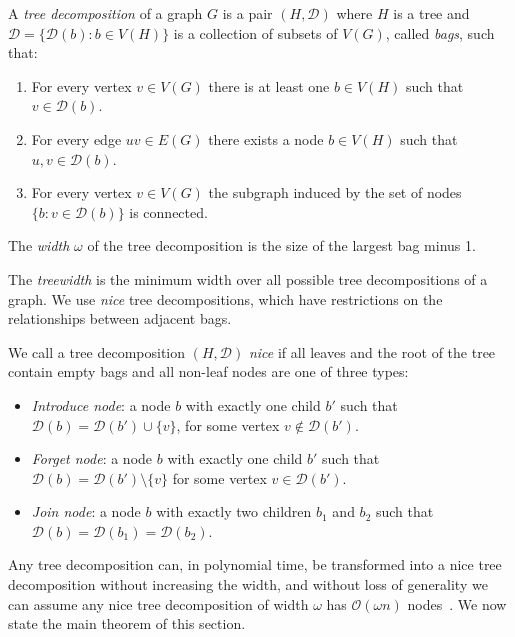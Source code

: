 \documentclass[runningheads]{llncs}
\begin{document}
\begin{definition}
    \label{def:tree_decomp} 
    A \emph{tree decomposition} of a graph $G$ is a pair $(H,\mathcal{D})$ where $H$ is a tree and $\mathcal{D}=\{\mathcal{D}(b):b\in V(H)\}$ is a collection of subsets of $V(G)$, called \emph{bags}, such that:
\begin{enumerate}
    \item For every vertex $v \in V(G)$ there is at least one $b \in V(H)$ such that $v \in \mathcal{D}(b)$.
    \item For every edge $uv \in E(G)$ there exists a node $b \in V(H)$ such that $u,v \in \mathcal{D}(b)$.
    \item For every vertex $v \in V(G)$ the subgraph induced by the set of nodes $\{b: v \in \mathcal{D}(b)\}$ is connected.
\end{enumerate}
The \emph{width} $\omega$ of the tree decomposition is the size of the largest bag minus 1.
\end{definition}
 The \emph{treewidth} is the minimum width over all possible tree decompositions of a graph. We use \emph{nice} tree decompositions, which have restrictions on the relationships between adjacent bags. 
 \begin{definition}
We call a tree decomposition $(H,\mathcal{D})$ \emph{nice} if all leaves and the root of the tree contain empty bags and all non-leaf nodes are one of three types:
\begin{itemize}
    \item \emph{Introduce node}: a node $b$ with exactly one child $b'$ such that $\mathcal{D}(b)=\mathcal{D}(b')\cup \{v\}$, for some vertex $v \notin \mathcal{D}(b')$.
    \item \emph{Forget node}: a node $b$ with exactly one child $b'$ such that $\mathcal{D}(b)=\mathcal{D}(b')\setminus \{v\}$ for some vertex $v \in \mathcal{D}(b')$.
    \item \emph{Join node}: a node $b$ with exactly two children $b_1$ and $b_2$ such that $\mathcal{D}(b)=\mathcal{D}(b_1)=\mathcal{D}(b_2)$.
\end{itemize}
\end{definition}
 Any tree decomposition can, in polynomial time, be transformed into a nice tree decomposition without increasing the width, and without loss of generality we can assume any nice tree decomposition of width $\omega$ has $\mathcal{O}(\omega n)$ nodes~\cite{cygan2015parameterized}. We now state the main theorem of this section.
\end{document}
